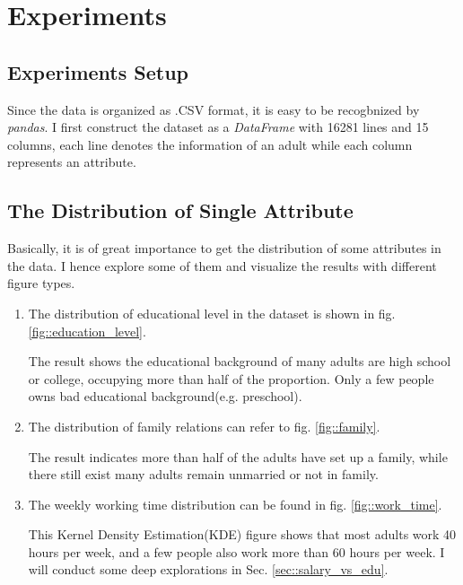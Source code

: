 \documentclass[12pt,a4paper]{article}
\theoremstyle{definition}
\begin{document}
\section{Experiments}

\subsection{Experiments Setup}

Since the data is organized as .CSV format, it is easy to be recogbnized by \textit{pandas}. I first construct the dataset as a \textit{DataFrame} with 16281 lines and 15 columns, each line denotes the information of an adult while each column represents an attribute.

\subsection{The Distribution of Single Attribute}

Basically, it is of great importance to get the distribution of some attributes in the data. I hence explore some of them and visualize the results with different figure types.

\begin{enumerate}
\item The distribution of educational level in the dataset is shown in fig. \ref{fig::education_level}.

The result shows the educational background of many adults are high school or college, occupying more than half of the proportion. Only a few people owns bad educational background(e.g. preschool).

\item The distribution of family relations can refer to fig. \ref{fig::family}.

The result indicates more than half of the adults have set up a family, while there still exist many adults remain unmarried or not in family.

\item The weekly working time distribution can be found in fig. \ref{fig::work_time}.

This Kernel Density Estimation(KDE) figure shows that most adults work 40 hours per week, and a few people also work more than 60 hours per week. I will conduct some deep explorations in Sec. \ref{sec::salary_vs_edu}.

\end{enumerate}
\end{document}
